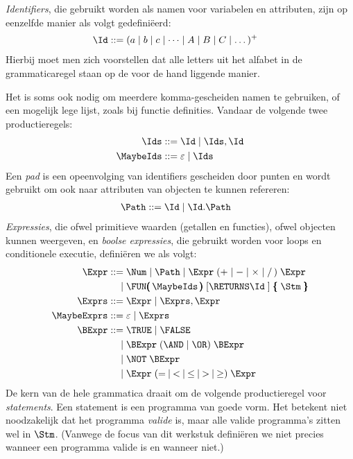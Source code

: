 \emph{Identifiers}, die gebruikt worden als namen voor variabelen en attributen, zijn op eenzelfde manier als volgt gedefiniëerd:
%
\begin{align*}
  \Id \GrammarDef (a \mid b \mid c \mid \dots \mid A \mid B \mid C \mid \dots)^+
\end{align*}
%
Hierbij moet men zich voorstellen dat alle letters uit het alfabet in de grammaticaregel staan op de voor de hand liggende manier.

Het is soms ook nodig om meerdere komma-gescheiden namen te gebruiken, of een mogelijk lege lijst, zoals bij functie definities. Vandaar de volgende twee productieregels:
%
\begin{align*}
  \Ids \GrammarDef \Id \mid \Ids, \Id \\
  \MaybeIds \GrammarDef \varepsilon \mid \Ids
\end{align*}
%
Een \emph{pad} is een opeenvolging van identifiers gescheiden door punten en wordt gebruikt om ook naar attributen van objecten te kunnen refereren:
%
\begin{align*}
  \Path \GrammarDef \Id \mid \Id . \Path
\end{align*}
%
\emph{Expressies}, die ofwel primitieve waarden (getallen en functies), ofwel objecten kunnen weergeven, en \emph{boolse expressies}, die gebruikt worden voor loops en conditionele executie, definiëren we als volgt:
%
\begin{align*}
  \Expr \GrammarDef \Num \mid \Path \mid \Expr\; (+ \mid - \mid \times \mid /\,)\; \Expr \\
  \GrammarOr \FUN\pmb{(}\,\MaybeIds\,\pmb{)}\; \GrammarOpt{\RETURNS \Id\;} \pmb{\{}\; \Stm\; \pmb{\}} \\
  \Exprs \GrammarDef \Expr \mid \Exprs, \Expr \\
  \MaybeExprs \GrammarDef \varepsilon \mid \Exprs \\
  \BExpr \GrammarDef \TRUE \mid \FALSE \\
  \GrammarOr \BExpr\; (\AND \mid \OR)\; \BExpr \\
  \GrammarOr \NOT\; \BExpr \\
  \GrammarOr \Expr\; (=\: \mid\: <\: \mid\: \le\: \mid\: >\: \mid\: \ge)\; \Expr
\end{align*}
%
De kern van de hele grammatica draait om de volgende productieregel voor \emph{statements}. Een statement is een programma van goede vorm. Het betekent niet noodzakelijk dat het programma \emph{valide} is, maar alle valide programma's zitten wel in $\Stm$. (Vanwege de focus van dit werkstuk definiëren we niet precies wanneer een programma valide is en wanneer niet.)
